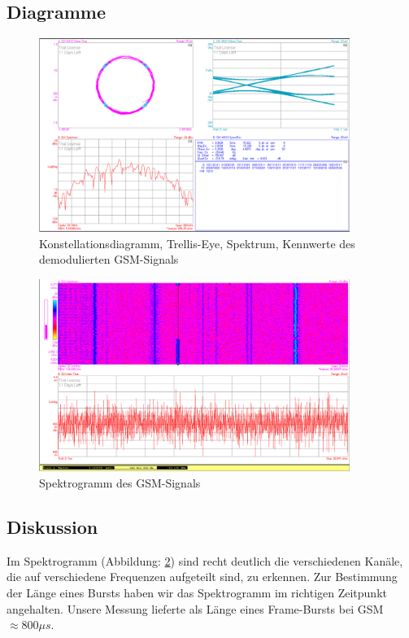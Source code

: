 \documentclass[12pt,a4paper,ngerman]{article}
\begin{document}
\subsection{Diagramme}
\begin{figure}[H]
\centering
\includegraphics[width=0.9\textwidth]{figures/Aufgabe4_demod.jpg} 
\caption{Konstellationsdiagramm, Trellis-Eye, Spektrum, Kennwerte des demodulierten GSM-Signals}
\label{fig:a4demod}
\end{figure}

\begin{figure}[H]
\centering
\includegraphics[width=0.9\textwidth]{figures/Aufgabe4_Spektrogramm.jpg} 
\caption{Spektrogramm des GSM-Signals}
\label{fig:spectrogram}
\end{figure}




\subsection{Diskussion}

Im Spektrogramm (Abbildung: \ref{fig:spectrogram}) sind recht deutlich die verschiedenen Kanäle, die auf verschiedene Frequenzen aufgeteilt sind, zu erkennen. Zur Bestimmung der Länge eines Bursts haben wir das Spektrogramm im richtigen Zeitpunkt angehalten. Unsere Messung lieferte als Länge eines Frame-Bursts bei GSM $\approx 800 \mu s$. 
\end{document}
